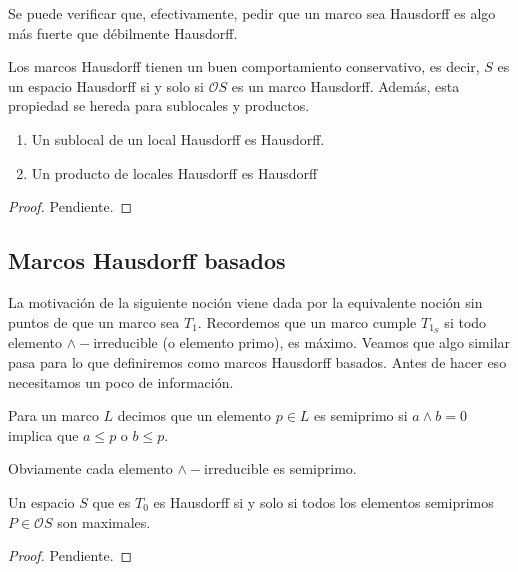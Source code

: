 \documentclass{comunicaciones}
\begin{document}
Se puede verificar que, efectivamente, pedir que un marco sea Hausdorff es algo más fuerte que débilmente Hausdorff.\\

\begin{obs}\label{Observacion3.4.1}
Los marcos Hausdorff tienen un buen comportamiento conservativo, es decir, $S$ es un espacio Hausdorff si y solo si $\mathcal{O}S$ es un marco Hausdorff. Además, esta propiedad se hereda para sublocales y productos.
\end{obs}

\begin{prop}\label{Heredar H}
    \begin{enumerate}
        \item Un sublocal de un local Hausdorff es Hausdorff.
        \item Un producto de locales Hausdorff es Hausdorff
    \end{enumerate}
\end{prop}

\begin{proof}
    Pendiente.
\end{proof}

\subsection{Marcos Hausdorff basados}

La motivación de la siguiente noción viene dada por la equivalente noción sin puntos de que un marco sea $T_1$. Recordemos que un marco cumple $T_{1_S}$ si todo elemento $\wedge-$irreducible (o elemento primo), es máximo. Veamos que algo similar pasa para lo que definiremos como marcos Hausdorff basados. Antes de hacer eso necesitamos un poco de información.

\begin{dfn}\label{Semiprimo}
    Para un marco $L$ decimos que un elemento $p\in L$ es semiprimo si $a\wedge b=0$ implica que $a\leq p$ o $b\leq p$.
\end{dfn}

Obviamente cada elemento $\wedge-$irreducible es semiprimo. 

\begin{prop}\label{Proposicion4.1.1}
    Un espacio $S$ que es $T_0$ es Hausdorff si y solo si todos los elementos semiprimos $P\in \mathcal{O}S$ son maximales.
\end{prop}

\begin{proof}
    Pendiente.
\end{proof}
\end{document}
